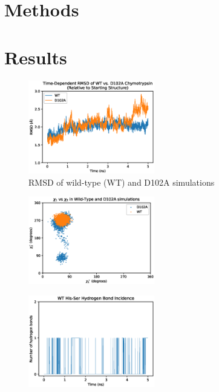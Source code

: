 \documentclass[11pt, twocolumn]{article}
\begin{document}
\section{Methods}

\lipsum[1-3]

\section{Results}

\begin{figure}[H]
    \centering
        \includegraphics[width=0.49\textwidth]{rmsds.eps}
    \caption{RMSD of wild-type (WT) and D102A simulations}
\end{figure}

\begin{figure}[H]
    \centering
        \includegraphics[width=0.49\textwidth]{chi_plot_wt_d102a.eps}
    \caption{}
\end{figure}

\begin{figure}[H]
    \centering
        \includegraphics[width=0.49\textwidth]{wt_hbonds_his_ser.eps}
    \caption{}
\end{figure}
\end{document}
